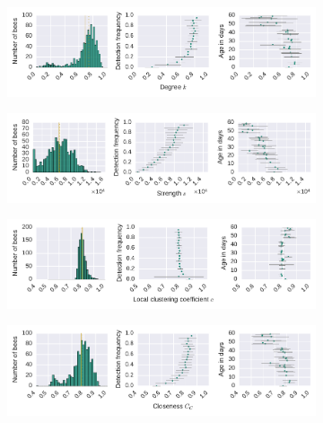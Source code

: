 \begin{figure}[!h]
	\centering
	\begin{subfigure}[b]{1.0\textwidth}
	\centering
	\includegraphics[width=1.0\textwidth]{Figures/n1-stat-degreeAgeDetF.pdf}
	\end{subfigure}
	\begin{subfigure}[b]{1.0\textwidth}
	\centering
	\includegraphics[width=1.0\textwidth]{Figures/n1-stat-strengthAgeDetF.pdf}
	\end{subfigure}
	\begin{subfigure}[b]{1.0\textwidth}
	\centering
	\includegraphics[width=1.0\textwidth]{Figures/n1-stat-lccAgeDetF.pdf}
	\end{subfigure}
	\begin{subfigure}[b]{1.0\textwidth}
	\centering
	\includegraphics[width=1.0\textwidth]{Figures/n1-stat-closenessAgeDetF.pdf}

\end{subfigure}
\end{figure}
